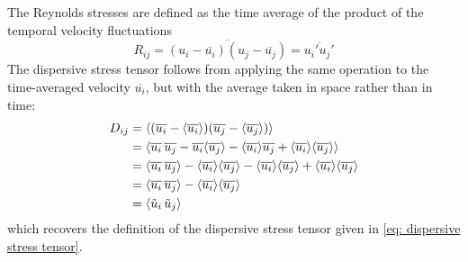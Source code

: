 The Reynolds stresses are defined as the time average of the product of the temporal velocity fluctuations
\begin{equation}\label{eq: reynolds stresses}
    R_{ij} = \overline{(u_i - \overline{u_i})(u_j - \overline{u_j})}
    = \overline{u_i' u_j'}
\end{equation}
The dispersive stress tensor follows from applying the same operation to the time-averaged velocity $\overline{u_i}$, but with the average taken in space rather than in time:
\begin{align}
    D_{ij}  &= \langle (\overline{u_i} - \langle \overline{u_i}\rangle)(\overline{u_j} - \langle \overline{u_j}\rangle) \rangle \notag\\
            &= \langle \overline{u_i}\,\overline{u_j} - \overline{u_i}\langle\overline{u_j}\rangle - \langle \overline{u_i}\rangle\overline{u_j} + \langle\overline{u_i}\rangle\langle\overline{u_j}\rangle \rangle \notag\\
            &= \langle \overline{u_i}\,\overline{u_j} \rangle - \langle\overline{u_i}\rangle\langle\overline{u_j}\rangle - \langle\overline{u_i}\rangle\langle\overline{u_j}\rangle + \langle\overline{u_i}\rangle\langle\overline{u_j}\rangle \notag\\
            &= \langle \overline{u_i}\,\overline{u_j} \rangle - \langle\overline{u_i}\rangle\langle\overline{u_j}\rangle \notag\\
            &= \langle \tilde{u}_i\,\tilde{u}_j \rangle \label{eq: dispersive stress}
\end{align}
which recovers the definition of the dispersive stress tensor given in \autoref{eq: dispersive stress tensor}.


